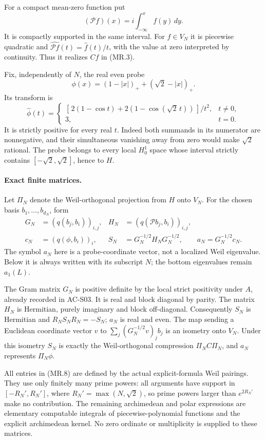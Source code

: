 For a compact mean-zero function put
\[
 (\mathcal P f)(x)=i\int_{-\infty}^x f(y)\,dy.
 \tag{MR.5}
\]
It is compactly supported in the same interval.  For \(f\in V_N\)
it is piecewise quadratic and
\(\widehat{\mathcal P f}(t)=\widehat f(t)/t\), with the value at
zero interpreted by continuity.  Thus it realizes \(Cf\) in
(MR.3).

Fix, independently of \(N\), the real even probe
\[
 \phi(x)=(1-|x|)_++(\sqrt2-|x|)_+.
 \tag{MR.6}
\]
Its transform is
\[
 \widehat\phi(t)=
 \begin{cases}
 [\,2(1-\cos t)+2(1-\cos(\sqrt2\,t))\,]/t^2,&t\ne0,\\
 3,&t=0.
 \end{cases}
 \tag{MR.7}
\]
It is strictly positive for every real \(t\).  Indeed both
summands in its numerator are nonnegative, and their simultaneous
vanishing away from zero would make \(\sqrt2\) rational.
The probe belongs to every local \(H^1_0\) space whose interval
strictly contains \([-\sqrt2,\sqrt2]\), hence to \(H\).

\paragraph{Exact finite matrices.}
Let \(\Pi_N\) denote the Weil-orthogonal projection from \(H\) onto
\(V_N\).  For the chosen basis \(b_1,\ldots,b_{d_N}\), form
\[
 \begin{aligned}
 G_N&=(q(b_j,b_i))_{i,j},&
 H_N&=(q(\mathcal P b_j,b_i))_{i,j},\\
 c_N&=(q(\phi,b_i))_i,&
 S_N&=G_N^{-1/2}H_NG_N^{-1/2},\qquad
 a_N=G_N^{-1/2}c_N .
 \end{aligned}
 \tag{MR.8}
\]
The symbol \(a_N\) here is a probe-coordinate vector, not a
localized Weil eigenvalue.  Below it is always written with
its subscript \(N\); the bottom eigenvalues remain \(a_1(L)\).

The Gram matrix \(G_N\) is positive definite by the local strict
positivity under \(A\), already recorded in AC-S03.  It is real and block diagonal by parity.
The matrix \(H_N\) is Hermitian, purely imaginary and block
off-diagonal.  Consequently \(S_N\) is Hermitian and
\(R_NS_NR_N=-S_N\); \(a_N\) is real and even.
The map sending a Euclidean coordinate vector \(v\) to
\(\sum_j(G_N^{-1/2}v)_jb_j\) is an isometry onto \(V_N\).
Under this isometry \(S_N\) is exactly the Weil-orthogonal
compression \(\Pi_NC\Pi_N\), and \(a_N\) represents \(\Pi_N\phi\).

All entries in (MR.8) are defined by the actual explicit-formula
Weil pairings.  They use only finitely many prime powers:
all arguments have support in
\([-R_N',R_N']\), where \(R_N'=\max(N,\sqrt2)\), so prime powers
larger than \(e^{2R_N'}\) make no contribution.  The remaining
archimedean and polar expressions are elementary computable
integrals of piecewise-polynomial functions and the explicit
archimedean kernel.  No zero ordinate or multiplicity is supplied
to these matrices.

